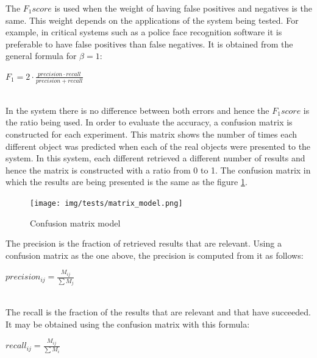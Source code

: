 
		The $F_1 score$ is used when the weight of having false positives and negatives is the same. 
		This weight depends on the applications of the system being tested. 
		For example, in critical systems such as a police face recognition software it is preferable to have false positives than false negatives. 
		It is obtained from the general formula for $\beta=1$: 	
		\\
		\begin{center}
		$F_1=2\cdot\frac{precision \cdot recall}{precision + recall}$
		\end{center}

		\\

		In the system there is no difference between both errors and hence the $F_1 score$ is the ratio being used. 
		In order to evaluate the accuracy, a confusion matrix is constructed for each experiment. 
		This matrix shows the number of times each different object was predicted when each of the real objects were presented to the system. 
		In this system, each different retrieved a different number of results and hence the matrix is constructed with a ratio from 0 to 1. 
		The confusion matrix in which the results are being presented is the same as the figure \ref{matrix_model}. 


		\begin{figure}[H]
				\begin{center}
			    \texttt{[image: img/tests/matrix\_model.png]}
				\caption[Confusion matrix model]{Confusion matrix model}
				\end{center}
				\label{matrix_model}
		\end{figure}


		The precision is the fraction of retrieved results that are relevant.  
		Using a confusion matrix as the one above, the precision is computed from it as follows: 
		\\
		\begin{center}
		$precision_{ij}=\frac{M_{ij}}{\sum M_j}$
		\end{center}

		\\

		The recall is the fraction of the results that are relevant and that have succeeded. 
		It may be obtained using the confusion matrix with this formula: 
		\\
		\begin{center}
		$recall_{ij}=\frac{M_{ij}}{\sum M_i}$
		\end{center}
		\\	

